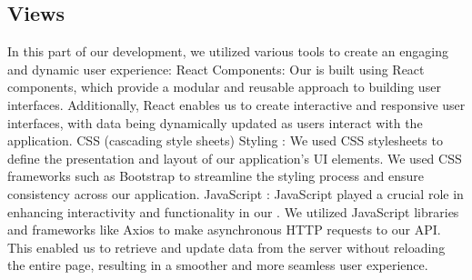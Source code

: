 \subsection{Views}\label{views}
\hspace*{0.5cm} In this part of our development, we utilized various  tools to create an engaging and dynamic user experience: React \cite{react} Components: Our  is built using React \cite{react} components, which provide a modular and reusable approach to building user interfaces. Additionally, React \cite{react} enables us to create interactive and responsive user interfaces, with data being dynamically updated as users interact with the application. CSS (cascading style sheets) Styling \cite{htmlcssjs}: We used CSS stylesheets to define the presentation and layout of our application's UI elements. We used CSS \cite{htmlcssjs} frameworks such as Bootstrap \cite{boostrap} to streamline the styling process and ensure consistency across our application. JavaScript \cite{htmlcssjs}: JavaScript played a crucial role in enhancing interactivity and functionality in our . We utilized JavaScript libraries and frameworks like Axios to make asynchronous HTTP requests to our  API. This enabled us to retrieve and update data from the server without reloading the entire page, resulting in a smoother and more seamless user experience.

\par
\hrulefill 

